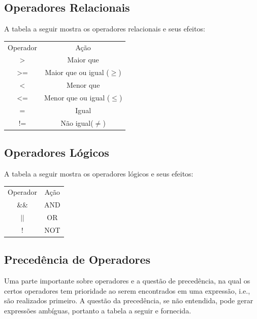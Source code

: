 \documentclass[12pt, letterpaper]{article}
\newcommand\tab[1][1cm]{\hspace*{#1}}
\begin{document}
\subsection{Operadores Relacionais}
\tab A tabela a seguir mostra os operadores relacionais e seus efeitos:  

\begin{center}
\begin{tabular}{c c}
Operador & Ação \\
\textgreater & Maior que \\
\textgreater= & Maior que ou igual ($\geq$) \\
\textless & Menor que \\
\textless= & Menor que ou igual ($\leq$) \\
= & Igual \\
!= & Não igual($\neq$) \\
\end{tabular}
\end{center}

\begin{spacing}{1.5}
\end{spacing}

\subsection{Operadores Lógicos}
\tab A tabela a seguir mostra os operadores lógicos e seus efeitos:  

\begin{spacing}{1.5}
\end{spacing}

\begin{center}
\begin{tabular}{c c}
Operador & Ação \\
\&\& & AND \\
$||$ & OR \\
! & NOT \\
\end{tabular}
\end{center}

\begin{spacing}{1.5}
\end{spacing}

\subsection{Precedência de Operadores}
\tab Uma parte importante sobre operadores e a questão de precedência, na qual os certos operadores
tem prioridade ao serem encontrados em uma expressão, i.e., são realizados primeiro. A questão da 
precedência, se não entendida, pode gerar expressões ambíguas, portanto a tabela a seguir e fornecida.
  
\end{document}
